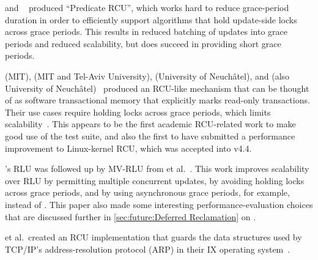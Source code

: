  and ~\cite{Arbel:2015:PRR:2858788.2688518}
produced ``Predicate RCU'', which works hard to reduce grace-period
duration in order to efficiently support algorithms that hold
update-side locks across grace periods.
This results in reduced batching of updates into grace periods
and reduced scalability, but does succeed in providing short
grace periods.

\QuickQuizEnd

 (MIT),  (MIT and Tel-Aviv University),
 (University of Neuch\^{a}tel), and  (also
University of Neuch\^{a}tel)~\cite{Matveev:2015:RLS:2815400.2815406}
produced an RCU-like mechanism that can be thought of as
software transactional memory that explicitly marks
read-only transactions.
Their use cases require holding locks across grace periods, which limits
scalability~\cite{PaulEMcKenney2015ReadMostly,PaulEMcKenney2015ReadMostlySidebar}.
This appears to be the first academic RCU-related work to
make good use of the  test suite, and also the
first to have submitted a performance improvement to Linux-kernel
RCU, which was accepted into v4.4.

's RLU was followed up by MV-RLU from
 et al.~\cite{Kim:2019:MSR:3297858.3304040}.
This work improves scalability over RLU by permitting multiple concurrent
updates, by avoiding holding locks across grace periods, and by using
asynchronous grace periods, for example,  instead of
.
This paper also made some interesting performance-evaluation choices that
are discussed further in
\cref{sec:future:Deferred Reclamation}
on
.

 et al.~created an RCU implementation that guards the
data structures used by TCP/IP's address-resolution protocol (ARP)
in their IX operating system~\cite{Belay:2016:IOS:3014162.2997641}.

